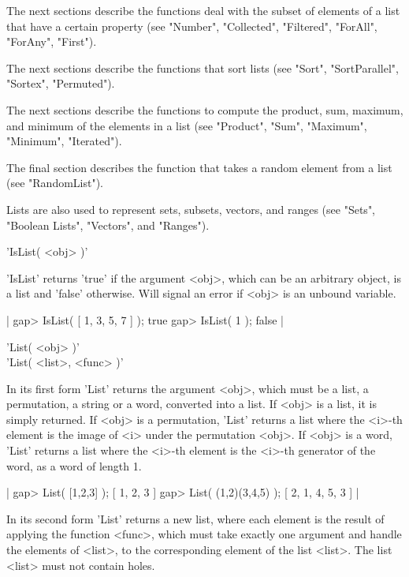 The next sections describe the functions deal with the subset of elements
of a list    that have  a  certain property  (see  "Number", "Collected",
"Filtered", "ForAll", "ForAny", "First").

The  next sections describe the functions  that sort lists  (see  "Sort",
"SortParallel", "Sortex", "Permuted").

The  next sections describe the functions  to  compute the product,  sum,
maximum, and minimum  of the elements  in  a list (see "Product",  "Sum",
"Maximum", "Minimum", "Iterated").

The final section describes the function that takes a random element from
a list (see "RandomList").

Lists are also used to represent sets,  subsets, vectors, and ranges (see
"Sets", "Boolean Lists", "Vectors", and "Ranges").

%

'IsList( <obj> )'

'IsList' returns 'true' if the argument <obj>, which can be  an arbitrary
object, is a list  and 'false' otherwise.  Will signal  an error if <obj>
is an unbound variable.

|    gap> IsList( [ 1, 3, 5, 7 ] );
    true
    gap> IsList( 1 );
    false |

%
%

'List( <obj> )' \\
'List( <list>, <func> )'

In  its  first  form  'List' returns the argument <obj>, which must be  a
list, a permutation, a string or a word, converted into a list.  If <obj>
is  a list, it is  simply returned.   If <obj>  is a  permutation, 'List'
returns a list  where the <i>-th element  is the image  of <i> under  the
permutation <obj>.  If <obj> is a word, 'List' returns a list  where  the
<i>-th element is the <i>-th generator of  the  word, as a word of length
1.

|    gap> List( [1,2,3] );
    [ 1, 2, 3 ]
    gap> List( (1,2)(3,4,5) );
    [ 2, 1, 4, 5, 3 ] |

In its second  form 'List' returns a new  list, where each element is the
result  of applying  the  function <func>, which  must  take  exactly one
argument and handle the elements  of <list>, to the corresponding element
of the list <list>.  The list <list> must not contain holes.


